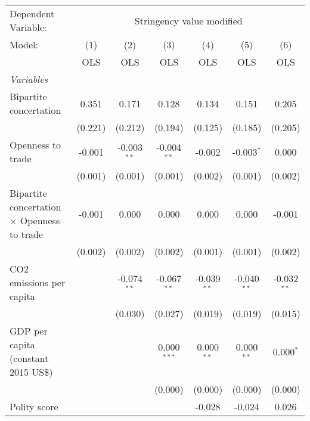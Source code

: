 
\begingroup
\centering
\begin{tabular}{lcccccc}
   \toprule
   Dependent Variable: & \multicolumn{6}{c}{Stringency value modified}\\
   Model:                                             & (1)     & (2)           & (3)           & (4)           & (5)           & (6)\\  
                                                      &  OLS    & OLS           & OLS           & OLS           & OLS           & OLS\\  
   \midrule
   \emph{Variables}\\
   Bipartite concertation                             & 0.351   & 0.171         & 0.128         & 0.134         & 0.151         & 0.205\\   
                                                      & (0.221) & (0.212)       & (0.194)       & (0.125)       & (0.185)       & (0.205)\\   
   Openness to trade                                  & -0.001  & -0.003$^{**}$ & -0.004$^{**}$ & -0.002        & -0.003$^{*}$  & 0.000\\   
                                                      & (0.001) & (0.001)       & (0.001)       & (0.002)       & (0.001)       & (0.002)\\   
   Bipartite concertation $\times$ Openness to trade  & -0.001  & 0.000         & 0.000         & 0.000         & 0.000         & -0.001\\   
                                                      & (0.002) & (0.002)       & (0.002)       & (0.001)       & (0.001)       & (0.002)\\   
   CO2 emissions per capita                           &         & -0.074$^{**}$ & -0.067$^{**}$ & -0.039$^{**}$ & -0.040$^{**}$ & -0.032$^{**}$\\   
                                                      &         & (0.030)       & (0.027)       & (0.019)       & (0.019)       & (0.015)\\   
   GDP per capita (constant 2015 US\$)                &         &               & 0.000$^{***}$ & 0.000$^{**}$  & 0.000$^{**}$  & 0.000$^{*}$\\   
                                                      &         &               & (0.000)       & (0.000)       & (0.000)       & (0.000)\\   
   Polity score                                       &         &               &               & -0.028        & -0.024        & 0.026\\   

\end{tabular}
